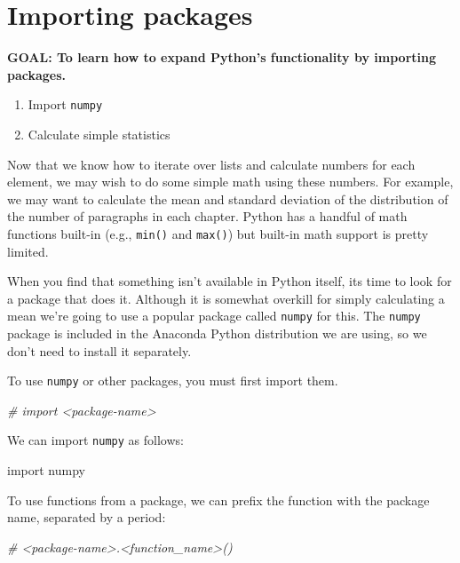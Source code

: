 \documentclass[]{book}
\newenvironment{Shaded}{\begin{snugshade}}{\end{snugshade}}
\newcommand{\CommentTok}[1]{\textcolor[rgb]{0.56,0.35,0.01}{\textit{#1}}}
\newcommand{\ImportTok}[1]{#1}
\newcommand{\NormalTok}[1]{#1}
\providecommand{\tightlist}{%
  \setlength{\itemsep}{0pt}\setlength{\parskip}{0pt}}
\begin{document}
\hypertarget{importing-packages}{%
\section{Importing packages}\label{importing-packages}}

\textbf{GOAL: To learn how to expand Python's functionality by importing packages.}

\begin{enumerate}
\def\labelenumi{\arabic{enumi}.}
\tightlist
\item
  Import \texttt{numpy}
\item
  Calculate simple statistics
\end{enumerate}

Now that we know how to iterate over lists and calculate numbers for each element, we may wish to do some simple math using these numbers. For example, we may want to calculate the mean and standard deviation of the distribution of the number of paragraphs in each chapter. Python has a handful of math functions built-in (e.g., \texttt{min()} and \texttt{max()}) but built-in math support is pretty limited.

When you find that something isn't available in Python itself, its time to look for a package that does it. Although it is somewhat overkill for simply calculating a mean we're going to use a popular package called \texttt{numpy} for this. The \texttt{numpy} package is included in the Anaconda Python distribution we are using, so we don't need to install it separately.

To use \texttt{numpy} or other packages, you must first import them.

\begin{Shaded}
\begin{Highlighting}[]
\CommentTok{# import <package-name>}
\end{Highlighting}
\end{Shaded}

We can import \texttt{numpy} as follows:

\begin{Shaded}
\begin{Highlighting}[]
\ImportTok{import}\NormalTok{ numpy}
\end{Highlighting}
\end{Shaded}

To use functions from a package, we can prefix the function with the package name, separated by a period:

\begin{Shaded}
\begin{Highlighting}[]
\CommentTok{# <package-name>.<function_name>()}
\end{Highlighting}
\end{Shaded}
\end{document}
